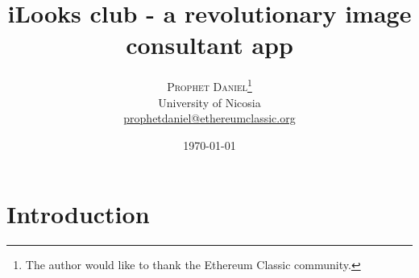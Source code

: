 \documentclass[twoside,twocolumn]{article}
\title{iLooks club - a revolutionary image consultant app} %
\author{%
\textsc{Prophet Daniel}\thanks{The author would like to thank the Ethereum Classic community.} \\[1ex] %
\normalsize University of Nicosia \\ %
\normalsize \href{mailto:prophetdaniel@ethereumclassic.org}{prophetdaniel@ethereumclassic.org} %
}
\date{\today} %
\begin{document}
\maketitle


\section{Introduction}

\end{document}

